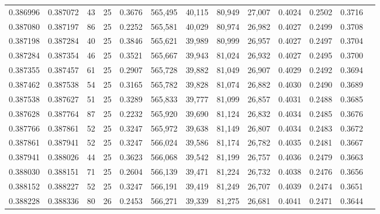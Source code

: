 \begin{tabular}{rrrrrrrrrrrrr}
0.386996 & 0.387072 &    43 &  25 &                                     0.3676 & 565,495 &  40,115 &  80,949 &  27,007 & 0.4024 & 0.2502 & 0.3716 \\
0.387080 & 0.387197 &    86 &  25 &                                     0.2252 & 565,581 &  40,029 &  80,974 &  26,982 & 0.4027 & 0.2499 & 0.3708 \\
0.387198 & 0.387284 &    40 &  25 &                                     0.3846 & 565,621 &  39,989 &  80,999 &  26,957 & 0.4027 & 0.2497 & 0.3704 \\
0.387284 & 0.387354 &    46 &  25 &                                     0.3521 & 565,667 &  39,943 &  81,024 &  26,932 & 0.4027 & 0.2495 & 0.3700 \\
0.387355 & 0.387457 &    61 &  25 &                                     0.2907 & 565,728 &  39,882 &  81,049 &  26,907 & 0.4029 & 0.2492 & 0.3694 \\
0.387462 & 0.387538 &    54 &  25 &                                     0.3165 & 565,782 &  39,828 &  81,074 &  26,882 & 0.4030 & 0.2490 & 0.3689 \\
0.387538 & 0.387627 &    51 &  25 &                                     0.3289 & 565,833 &  39,777 &  81,099 &  26,857 & 0.4031 & 0.2488 & 0.3685 \\
0.387628 & 0.387764 &    87 &  25 &                                     0.2232 & 565,920 &  39,690 &  81,124 &  26,832 & 0.4034 & 0.2485 & 0.3676 \\
0.387766 & 0.387861 &    52 &  25 &                                     0.3247 & 565,972 &  39,638 &  81,149 &  26,807 & 0.4034 & 0.2483 & 0.3672 \\
0.387861 & 0.387941 &    52 &  25 &                                     0.3247 & 566,024 &  39,586 &  81,174 &  26,782 & 0.4035 & 0.2481 & 0.3667 \\
0.387941 & 0.388026 &    44 &  25 &                                     0.3623 & 566,068 &  39,542 &  81,199 &  26,757 & 0.4036 & 0.2479 & 0.3663 \\
0.388030 & 0.388151 &    71 &  25 &                                     0.2604 & 566,139 &  39,471 &  81,224 &  26,732 & 0.4038 & 0.2476 & 0.3656 \\
0.388152 & 0.388227 &    52 &  25 &                                     0.3247 & 566,191 &  39,419 &  81,249 &  26,707 & 0.4039 & 0.2474 & 0.3651 \\
0.388228 & 0.388336 &    80 &  26 &                                     0.2453 & 566,271 &  39,339 &  81,275 &  26,681 & 0.4041 & 0.2471 & 0.3644 \\

\end{tabular}
